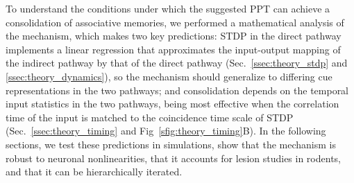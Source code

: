 


To understand the conditions under which the suggested PPT can achieve a consolidation of associative memories, we performed a mathematical analysis of the mechanism, which makes two key predictions: STDP in the direct pathway implements a linear regression that approximates the input-output mapping of the indirect pathway by that of the direct pathway (Sec.~\ref{ssec:theory_stdp} and \ref{ssec:theory_dynamics}), so the mechanism should generalize to differing cue representations in the two pathways; and consolidation depends on the temporal input statistics in the two pathways, being most effective when the correlation time of the input is matched to the coincidence time scale of STDP (Sec.~\ref{ssec:theory_timing} and Fig~\ref{sfig:theory_timing}B). In the following sections, we test these predictions in simulations, show that the mechanism is robust to neuronal nonlinearities, that it accounts for lesion studies in rodents, and that it can be hierarchically iterated.


